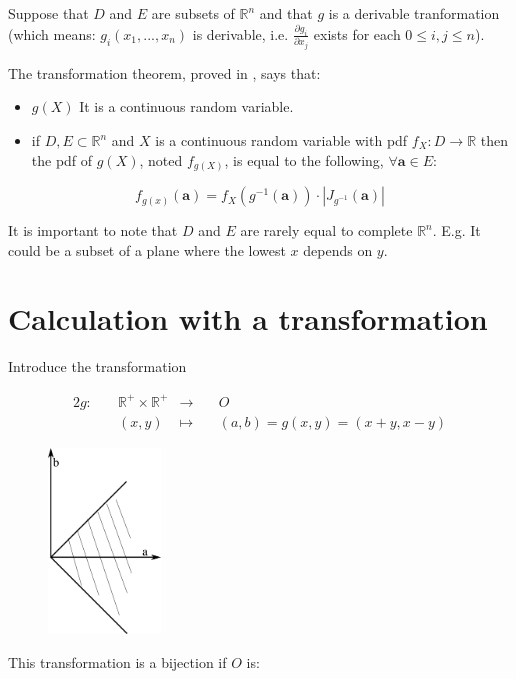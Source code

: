 \documentclass{article}
\newcommand\R{{\mathbb R} }
\begin{document}
Suppose that $D$ and $E$ are subsets of $\R^n$ and that $g$ is a derivable tranformation (which means: $g_i(x_1,...,x_n)$ is derivable, i.e. $\frac{\partial g_i}{\partial x_j}$ exists for each $0 \le i,j  \le n$).  

The transformation theorem, proved in \cite[2.7]{Hogg-McKean}, says that:

\begin{itemize}
\item $g(X)$ It is a continuous random variable.
\item if $D, E \subset \R ^n$ and $X$ is a continuous random variable with pdf $f_X:D \rightarrow \R $ then the pdf of
  $g(X)$, noted $f_{g(X)}$, is equal to the following, $\forall {\mathbf a} \in E$:
\end{itemize}

$$  f_{g(x)}({\mathbf a}) = f_X(g^{-1}({\mathbf a})) \cdot | J_{g^{-1}}({\mathbf a})|$$

It is important to note that $D$ and $E$ are rarely equal to complete $\R^n$. E.g. It could be a subset of a plane where the lowest $x$ depends on $y$.

\section{Calculation with a transformation}

Introduce the transformation 

\begin{alignat*}{2}
g:\quad & \R^+ \times \R^+ &\longrightarrow \quad & O \\
& (x,y) & \mapsto\quad & (a,b) = g(x,y) = (x+y, x-y) 
\end{alignat*}

\begin{figure}\includegraphics[width=30mm]{transformation-domain}\vspace{10mm}\end{figure}
This transformation is  a bijection if $O$ is:
\end{document}
